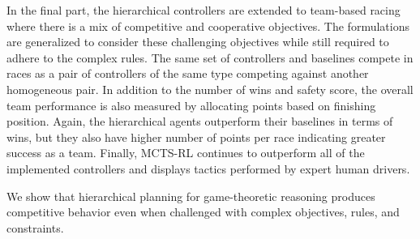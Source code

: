 \documentclass[12pt]{report}
\theoremstyle{definition}
\theoremstyle{remark}
\numberwithin{equation}{section}
\begin{document}
In the final part, the hierarchical controllers are extended to team-based racing where there is a mix of competitive and cooperative objectives. The formulations are generalized to consider these challenging objectives while still required to adhere to the complex rules. The same set of controllers and baselines compete in races as a pair of controllers of the same type competing against another homogeneous pair. In addition to the number of wins and safety score, the overall team performance is also measured by allocating points based on finishing position. Again, the hierarchical agents outperform their baselines in terms of wins, but they also have higher number of points per race indicating greater success as a team. Finally, MCTS-RL continues to outperform all of the implemented controllers and displays tactics performed by expert human drivers.

We show that hierarchical planning for game-theoretic reasoning produces competitive behavior even when challenged with complex objectives, rules, and constraints.


\tableofcontents   %

\listoftables      %
\listoffigures     %


% 






\appendices

\nocite{*}      %
\end{document}
